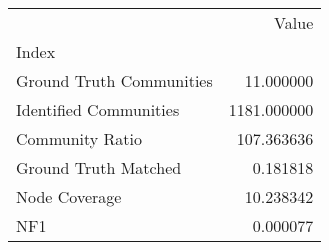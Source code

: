 \begin{tabular}{lr}
\toprule
{} &        Value \\
Index                    &              \\
\midrule
Ground Truth Communities &    11.000000 \\
Identified Communities   &  1181.000000 \\
Community Ratio          &   107.363636 \\
Ground Truth Matched     &     0.181818 \\
Node Coverage            &    10.238342 \\
NF1                      &     0.000077 \\
\bottomrule
\end{tabular}
